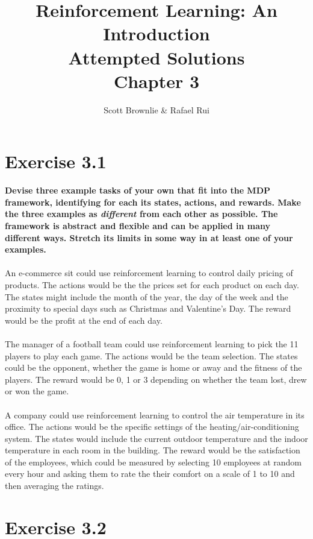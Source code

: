\documentclass[a4paper,11pt]{article}
\title{Reinforcement Learning: An Introduction \\ Attempted Solutions \\ Chapter 3}
\author{Scott Brownlie \& Rafael Rui}
\date{}
\numberwithin{equation}{section}
\theoremstyle{remark}
\begin{document}
\maketitle

\section{Exercise 3.1}

\textbf{Devise three example tasks of your own that fit into the MDP framework, identifying for each its states, actions, and rewards. Make the three examples as \emph{different} from each other as possible. The framework is abstract and flexible and can be applied in many different ways. Stretch its limits in some way in at least one of your examples.}
\\ \\
An e-commerce sit could use reinforcement learning to control daily pricing of products. The actions would be the the prices set for each product on each day. The states might include the month of the year, the day of the week and the proximity to special days such as Christmas and Valentine's Day. The reward would be the profit at the end of each day.
\\ \\
The manager of a football team could use reinforcement learning to pick the 11 players to play each game. The actions would be the team selection. The states could be the opponent, whether the game is home or away and the fitness of the players. The reward would be 0, 1 or 3 depending on whether the team lost, drew or won the game.  
\\ \\
A company could use reinforcement learning to control the air temperature in its office. The actions would be the specific settings of the heating/air-conditioning system. The states would include the current outdoor temperature and the indoor temperature in each room in the building. The reward would be the satisfaction of the employees, which could be measured by selecting 10 employees at random every hour and asking them to rate the their comfort on a scale of 1 to 10 and then averaging the ratings.


\section{Exercise 3.2}
\end{document}
